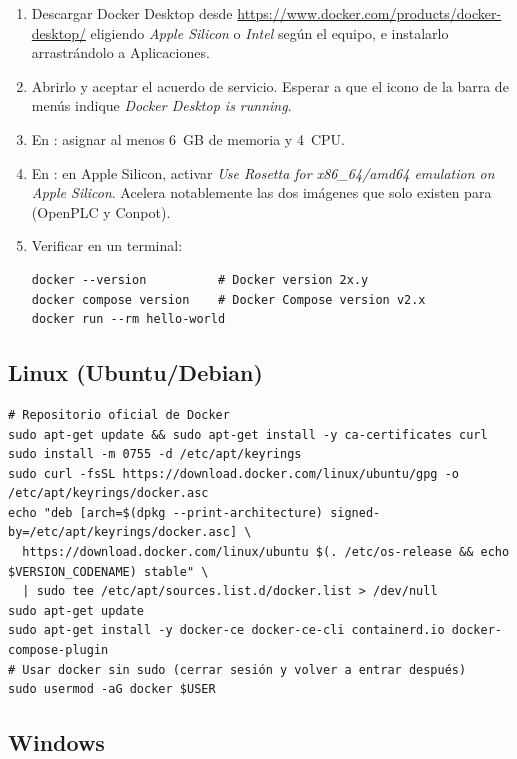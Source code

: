 \begin{enumerate}
  \item Descargar Docker Desktop desde \url{https://www.docker.com/products/docker-desktop/} eligiendo \emph{Apple Silicon} o \emph{Intel} según el equipo, e instalarlo arrastrándolo a Aplicaciones.
  \item Abrirlo y aceptar el acuerdo de servicio. Esperar a que el icono de la barra de menús indique \emph{Docker Desktop is running}.
  \item En : asignar al menos 6~GB de memoria y 4~CPU.
  \item En : en Apple Silicon, activar \emph{Use Rosetta for x86\_64/amd64 emulation on Apple Silicon}. Acelera notablemente las dos imágenes que solo existen para  (OpenPLC y Conpot).
  \item Verificar en un terminal:
\begin{lstlisting}[style=bash]
docker --version          # Docker version 2x.y
docker compose version    # Docker Compose version v2.x
docker run --rm hello-world
\end{lstlisting}
\end{enumerate}

\subsection{Linux (Ubuntu/Debian)}

\begin{lstlisting}[style=bash]
# Repositorio oficial de Docker
sudo apt-get update && sudo apt-get install -y ca-certificates curl
sudo install -m 0755 -d /etc/apt/keyrings
sudo curl -fsSL https://download.docker.com/linux/ubuntu/gpg -o /etc/apt/keyrings/docker.asc
echo "deb [arch=$(dpkg --print-architecture) signed-by=/etc/apt/keyrings/docker.asc] \
  https://download.docker.com/linux/ubuntu $(. /etc/os-release && echo $VERSION_CODENAME) stable" \
  | sudo tee /etc/apt/sources.list.d/docker.list > /dev/null
sudo apt-get update
sudo apt-get install -y docker-ce docker-ce-cli containerd.io docker-compose-plugin
# Usar docker sin sudo (cerrar sesión y volver a entrar después)
sudo usermod -aG docker $USER
\end{lstlisting}

\subsection{Windows}
\label{sec:windows}

